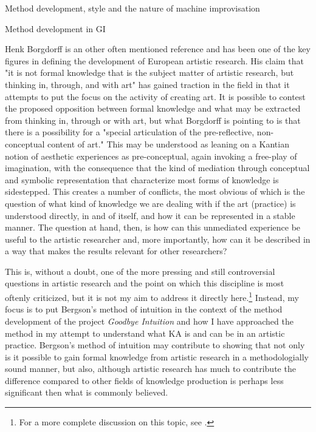 \documentclass[presentation]{beamer}
\begin{document}
\begin{frame}[label={sec:org08c5441}]{Method development, style and the nature of machine improvisation}
\begin{block}{Method development in GI}
{{Henk Borgdorff is an other often mentioned reference and has been one of the key figures in defining the development of European artistic research. His claim that "it is not formal knowledge that is the subject matter of artistic research, but thinking in, through, and with art" \citep[p. 143]{borgdorff2012} has gained traction in the field in that it attempts to put the focus on the activity of creating art. It is possible to contest the proposed opposition between formal knowledge and what may be extracted from thinking in, through or with art, but what Borgdorff is pointing to is that there is a possibility for a "special articulation of the pre-reflective, non-conceptual content of art." \citep[p. 143]{borgdorff2012} This may be understood as leaning on a Kantian notion of aesthetic experiences as pre-conceptual, again invoking a free-play of imagination, with the consequence that the kind of mediation through conceptual and symbolic representation that characterize most forms of knowledge is sidestepped. This creates a number of conflicts, the most obvious of which is the question of what kind of knowledge we are dealing with if the art (practice) is understood directly, in and of itself, and how it can be represented in a stable manner. The question at hand, then, is how can this unmediated experience be useful to the artistic researcher and, more importantly, how can it be described in a way that makes the results relevant for other researchers?

This is, without a doubt, one of the more pressing and still controversial questions in artistic research and the point on which this discipline is most oftenly criticized, but it is not my aim to address it directly here.\footnote{For a more complete discussion on this topic, see \citet{frisk-ost13}.} Instead, my focus is to put Bergson's method of intuition in the context of the method development of the project \emph{Goodbye Intuition} and how I have approached the method in my attempt to understand what KA is and can be in an artistic practice. Bergson's method of intuition may contribute to showing that not only is it possible to gain formal knowledge from artistic research in a methodologially sound manner, but also, although artistic research has much to contribute the difference compared to other fields of knowledge production is perhaps less significant then what is commonly believed.

}}
\end{block}
\end{frame}
\end{document}
